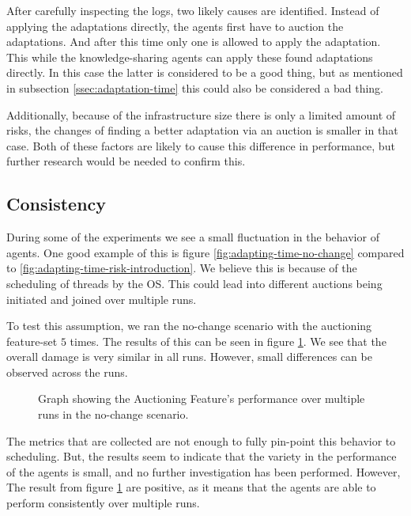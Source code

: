 After carefully inspecting the logs, two likely causes are identified. Instead of applying the adaptations directly, the agents first have to auction the adaptations. And after this time only one is allowed to apply the adaptation. This while the knowledge-sharing agents can apply these found adaptations directly. In this case the latter is considered to be a good thing, but as mentioned in subsection \ref{ssec:adaptation-time} this could also be considered a bad thing.

Additionally, because of the infrastructure size there is only a limited amount of risks, the changes of finding a better adaptation via an auction is smaller in that case. Both of these factors are likely to cause this difference in performance, but further research would be needed to confirm this.

%         


\subsection{Consistency}
\label{ssec:consecutive-runs}
During some of the experiments we see a small fluctuation in the behavior of agents. One good example of this is figure \ref{fig:adapting-time-no-change} compared to \ref{fig:adapting-time-risk-introduction}. We believe this is because of the scheduling of threads by the OS. This could lead into different auctions being initiated and joined over multiple runs. 
 
To test this assumption, we ran the no-change scenario with the auctioning feature-set $5$ times. The results of this can be seen in figure \ref{fig:multi-run-no-change}. We see that the overall damage is very similar in all runs. However, small differences can be observed across the runs.

\begin{figure}[H]
    \centering
        
    \caption{Graph showing the Auctioning Feature's performance over multiple runs in the no-change scenario.}
    \label{fig:multi-run-no-change}
\end{figure}

The metrics that are collected are not enough to fully pin-point this behavior to scheduling. But, the results seem to indicate that the variety in the performance of the agents is small, and no further investigation has been performed. However, The result from figure \ref{fig:multi-run-no-change} are positive, as it means that the agents are able to perform consistently over multiple runs.
